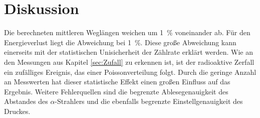 \section{Diskussion}
\label{sec:Diskussion}

Die berechneten mittleren Weglängen weichen um \SI{1}{\percent} voneinander ab.
Für den Energieverlust liegt die Abweichung bei \SI{1}{\percent}.
Diese große Abweichung kann einerseits mit der statistischen Unisicherheit der Zählrate erklärt werden.
Wie an den Messungen aus Kapitel \ref{sec:Zufall} zu erkennen ist, ist der radioaktive Zerfall ein zufälliges Ereignis,
das einer Poissonverteilung folgt.
Durch die geringe Anzahl an Messwerten hat dieser statistische Effekt einen großen Einfluss auf das Ergebnis.
Weitere Fehlerquellen sind die begrenzte Ablesegenauigkeit des Abstandes des $\alpha$-Strahlers und
die ebenfalls begrenzte Einstellgenauigkeit des Druckes.  
